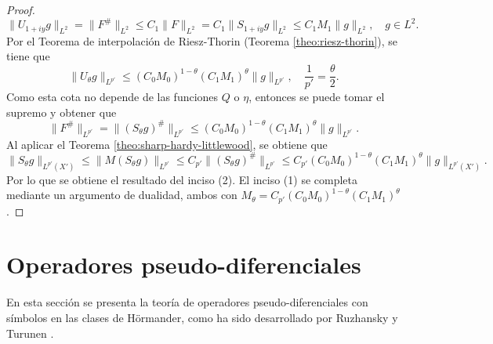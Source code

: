 \begin{proof}
	\begin{equation*}
		\|U_{1+iy} g\|_{L^2} = \|F^\#\|_{L^2} \leq C_1\|F\|_{L^2}= C_1\|S_{1+iy}g\|_{L^2} \leq C_1M_1 \|g\|_{L^2}, \quad g\in L^2.
	\end{equation*}
	Por el Teorema de interpolación de Riesz-Thorin (Teorema \ref{theo:riesz-thorin}), se tiene que 
	\begin{equation*}
		\|U_\theta g\|_{L^{p'}} \leq (C_0M_0)^{1-\theta}(C_1M_1)^\theta \|g\|_{L^{p'}}, \quad \frac{1}{p'} = \frac{\theta}{2}.
	\end{equation*}
	Como esta cota no depende de las funciones $Q$ o $\eta$, entonces se puede tomar el supremo y obtener que 
	\begin{equation*}
		\|F^\#\|_{L^{p'}} =\| (S_\theta g)^\#\|_{L^{p'}} \leq (C_0M_0)^{1-\theta}(C_1M_1)^\theta \|g\|_{L^{p'}}.
	\end{equation*}
	Al aplicar el Teorema \ref{theo:sharp-hardy-littlewood}, se obtiene que 
	\begin{equation*}
		\|S_\theta g\|_{L^{p'}(X')} \leq \|M(S_\theta g)\|_{L^{p'}} \leq C_{p'} \|(S_\theta g)^\#\|_{L^{p'}} \leq C_{p'} (C_0M_0)^{1-\theta}(C_1M_1)^\theta \|g\|_{L^{p'}(X')}.
	\end{equation*}
	Por lo que se obtiene el resultado del inciso (2). El inciso (1) se completa mediante un argumento de dualidad, ambos con $M_\theta = C_{p'} (C_0M_0)^{1-\theta}(C_1M_1)^\theta$.
\end{proof}
\chapter{Operadores pseudo-diferenciales}
En esta sección se presenta la teoría de operadores pseudo-diferenciales con símbolos en las clases de Hörmander, como ha sido desarrollado por Ruzhansky y Turunen \cite{ruzhansky-turunen}.
